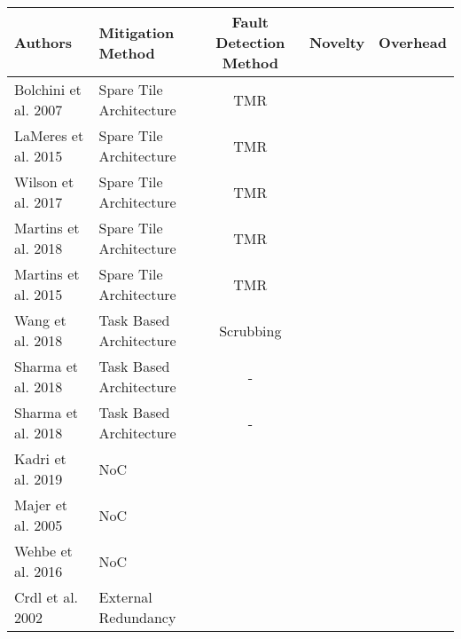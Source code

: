 \begin{table*}
    \begin{tabular*}{\textwidth}{@{\extracolsep{\fill}}llccc}
        \toprule
       \textbf{Authors} & \textbf{Mitigation Method} & \textbf{Fault Detection Method} & \textbf{Novelty} & \textbf{Overhead} \\
       \midrule
       \cite{bolchini_tmr_2007} Bolchini et al. 2007        & Spare Tile Architecture      & TMR & \\
       \cite{lameres_radsat_2015} LaMeres et al. 2015       & Spare Tile Architecture      & TMR & \\
       \cite{wilson_hybrid_2017} Wilson et al. 2017         & Spare Tile Architecture      & TMR & \\
       \cite{martins_dynamic_2018} Martins et al. 2018      & Spare Tile Architecture      & TMR & \\
       \cite{martins_tmr_2015} Martins et al. 2015          & Spare Tile Architecture      & TMR & \\
       \cite{wang_dynamic_2018} Wang et al. 2018            & Task Based Architecture      & Scrubbing & \\
       \cite{sharma_run-time_2018} Sharma et al. 2018       & Task Based Architecture      & - & \\
       \cite{sharma_run-time_2018} Sharma et al. 2018       & Task Based Architecture      & - & \\
       \cite{kadri_survey_2019} Kadri et al. 2019           & NoC                          & &\\
       \cite{majer_packet_2005} Majer et al. 2005           & NoC                          & &\\
       \cite{wehbe_secure_2016} Wehbe et al. 2016           & NoC                          & &\\
       \cite{crdl_fail-safe_2002} Crdl et al. 2002          & External Redundancy           & &\\
       \bottomrule
    \end{tabular*}
\end{table*}